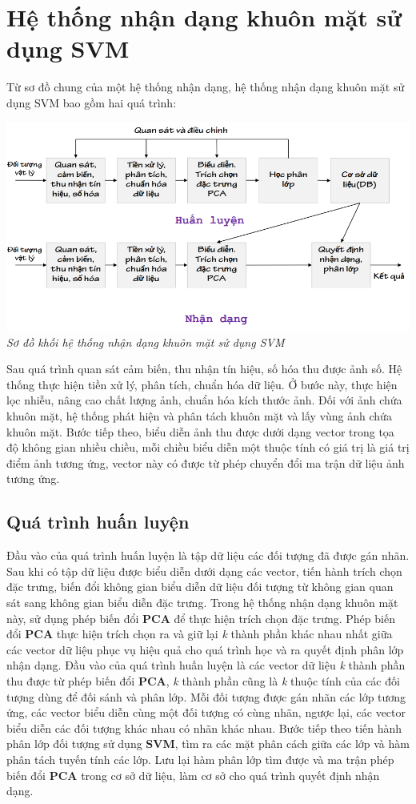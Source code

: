 \documentclass[12pt,a4paper]{article}
\begin{document}
\section{Hệ thống nhận dạng khuôn mặt sử dụng SVM}
Từ sơ đồ chung của một hệ thống nhận dạng, hệ thống nhận dạng khuôn mặt sử dụng SVM bao gồm hai quá trình:
\begin{center}
\includegraphics[scale=0.6]{25.png}\\
\textit{Sơ đồ khối hệ thống nhận dạng khuôn mặt sử dụng SVM}
\end{center}  
\par 
Sau quá trình quan sát cảm biến, thu nhận tín hiệu, số hóa thu được ảnh số. Hệ thống thực hiện tiền xử lý, phân tích, chuẩn hóa dữ liệu. Ở bước này, thực hiện lọc nhiễu, nâng cao chất lượng ảnh, chuẩn hóa kích thước ảnh. Đối với ảnh chứa khuôn mặt, hệ thống phát hiện và phân tách khuôn mặt và lấy vùng ảnh chứa khuôn mặt. Bước tiếp theo, biểu diễn ảnh thu được dưới dạng vector trong tọa độ không gian nhiều chiều, mỗi chiều biểu diễn một thuộc tính có giá trị là giá trị điểm ảnh tương ứng, vector này có được từ phép chuyển đổi ma trận dữ liệu ảnh tương ứng. \par    
\subsection{Quá trình huấn luyện}
Đầu vào của quá trình huấn luyện là tập dữ liệu các đối tượng đã được gán nhãn. Sau khi có tập dữ liệu được biểu diễn dưới dạng các vector, tiến hành trích chọn đặc trưng, biến đổi không gian biểu diễn dữ liệu đối tượng từ không gian quan sát sang không gian biểu diễn đặc trưng. Trong hệ thống nhận dạng khuôn mặt này, sử dụng phép biến đổi \textbf{PCA} để thực hiện trích chọn đặc trưng. Phép biến đổi \textbf{PCA} thực hiện trích chọn ra và giữ lại \textit{k} thành phần khác nhau nhất giữa các vector dữ liệu phục vụ hiệu quả cho quá trình học và ra quyết định phân lớp nhận dạng. Đầu vào của quá trình huấn luyện là các vector dữ liệu \textit{k} thành phần thu được từ phép biến đổi \textbf{PCA}, \textit{k} thành phần cũng là \textit{k} thuộc tính của các đối tượng dùng để đối sánh và phân lớp. Mỗi đối tượng được gán nhãn các lớp tương ứng, các vector biểu diễn cùng một đối tượng có cùng nhãn, ngược lại, các vector biểu diễn các đối tượng khác nhau có nhãn khác nhau. Bước tiếp theo tiến hành phân lớp đối tượng sử dụng \textbf{SVM}, tìm ra các mặt phân cách giữa các lớp và hàm phân tách tuyến tính các lớp. Lưu lại hàm phân lớp tìm được và ma trận phép biến đổi \textbf{PCA} trong cơ sở dữ liệu, làm cơ sở cho quá trình quyết định nhận dạng. 
\end{document}
